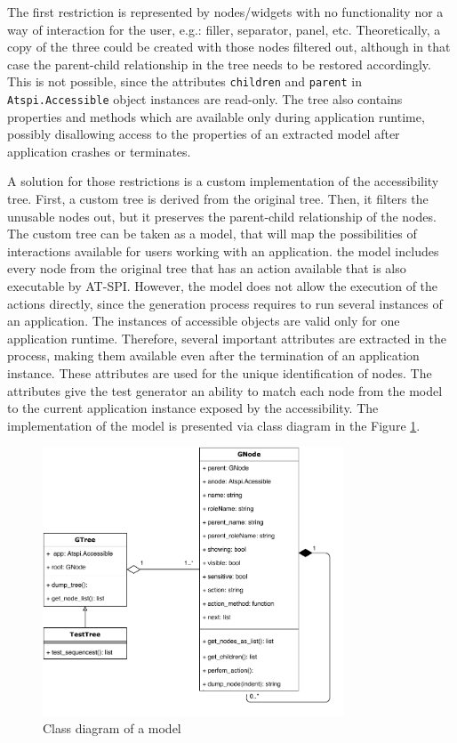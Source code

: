 The first restriction is represented by nodes/widgets with no functionality nor a way of interaction for the user, e.g.: filler, separator, panel, etc. Theoretically, a copy of the three could be created with those nodes filtered out, although in that case the parent-child relationship in the tree needs to be restored accordingly. This is not possible, since the attributes \texttt{children} and \texttt{parent} in \texttt{Atspi.Accessible} object instances are read-only. The tree also contains properties and methods which are available only during application runtime, possibly disallowing access to the properties of an extracted model after application crashes or terminates. 

A solution for those restrictions is a custom implementation of the accessibility tree. First, a custom tree is derived from the original tree. Then, it filters the unusable nodes out, but it preserves the parent-child relationship of the nodes. The custom tree can be taken as a model, that will map the possibilities of interactions available for users working with an application. the model includes every node from the original tree that has an action available that is also executable by AT-SPI. However, the model does not allow the execution of the actions directly, since the generation process requires to run several instances of an application. The instances of accessible objects are valid only for one application runtime. Therefore, several important attributes are extracted in the process, making them available even after the termination of an application instance. These attributes are used for the unique identification of nodes. The attributes give the test generator an ability to match each node from the model to the current application instance exposed by the accessibility. The implementation of the model is presented via class diagram in the Figure \ref{tree_diagram}.

\begin{figure}[hbt]
	\centering
	\includegraphics[width=0.8\textwidth,clip]{obrazky-figures/tree_diagram.pdf}
	\caption{Class diagram of a model}
	\label{tree_diagram}
\end{figure}

